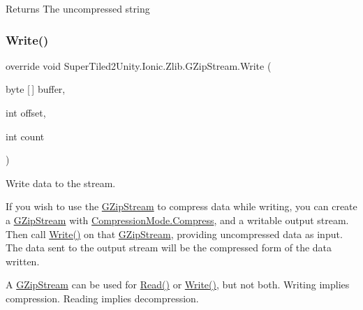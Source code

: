 \begin{DoxyReturn}{Returns}
The uncompressed string
\end{DoxyReturn}
\mbox{\label{class_super_tiled2_unity_1_1_ionic_1_1_zlib_1_1_g_zip_stream_a49032afb5806563236a5d53841abe2b8}} 
\subsubsection{\texorpdfstring{Write()}{Write()}}
{\footnotesize\ttfamily override void Super\+Tiled2\+Unity.\+Ionic.\+Zlib.\+G\+Zip\+Stream.\+Write (\begin{DoxyParamCaption}\item[{byte \mbox{[}$\,$\mbox{]}}]{buffer,  }\item[{int}]{offset,  }\item[{int}]{count }\end{DoxyParamCaption})}



Write data to the stream. 

If you wish to use the {\ttfamily \mbox{\hyperlink{class_super_tiled2_unity_1_1_ionic_1_1_zlib_1_1_g_zip_stream}{G\+Zip\+Stream}}} to compress data while writing, you can create a {\ttfamily \mbox{\hyperlink{class_super_tiled2_unity_1_1_ionic_1_1_zlib_1_1_g_zip_stream}{G\+Zip\+Stream}}} with {\ttfamily \mbox{\hyperlink{namespace_super_tiled2_unity_1_1_ionic_1_1_zlib_ad5b7635d92497e1c905e5de82eb1c6b1a8fa4fcfcda70410e089984d5f51ae97d}{Compression\+Mode.\+Compress}}}, and a writable output stream. Then call {\ttfamily \mbox{\hyperlink{class_super_tiled2_unity_1_1_ionic_1_1_zlib_1_1_g_zip_stream_a49032afb5806563236a5d53841abe2b8}{Write()}}} on that {\ttfamily \mbox{\hyperlink{class_super_tiled2_unity_1_1_ionic_1_1_zlib_1_1_g_zip_stream}{G\+Zip\+Stream}}}, providing uncompressed data as input. The data sent to the output stream will be the compressed form of the data written. 

A {\ttfamily \mbox{\hyperlink{class_super_tiled2_unity_1_1_ionic_1_1_zlib_1_1_g_zip_stream}{G\+Zip\+Stream}}} can be used for {\ttfamily \mbox{\hyperlink{class_super_tiled2_unity_1_1_ionic_1_1_zlib_1_1_g_zip_stream_a772b5013a585850ffaf8be4aa7f3dbcf}{Read()}}} or {\ttfamily \mbox{\hyperlink{class_super_tiled2_unity_1_1_ionic_1_1_zlib_1_1_g_zip_stream_a49032afb5806563236a5d53841abe2b8}{Write()}}}, but not both. Writing implies compression. Reading implies decompression. 


